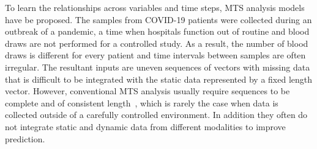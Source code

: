To learn the relationships across variables and time steps, MTS analysis models have be proposed. The samples from COVID-19 patients were collected during an outbreak of a pandemic, a time when hospitals function out of routine and blood draws are not performed for a controlled study. As a result, the number of blood draws is different for every patient and time intervals between samples are often irregular. The resultant inputs are uneven sequences of vectors with missing data that is difficult to be integrated with the static data represented by a fixed length vector. However, conventional MTS analysis usually require sequences to be complete and of consistent length~\cite{lu2018predicting,wang2017longitudinal,wang2016prediction,wang2012high}, which is rarely the case when data is collected outside of a carefully controlled environment. In addition they often do not integrate static and dynamic data from different modalities to improve prediction.


